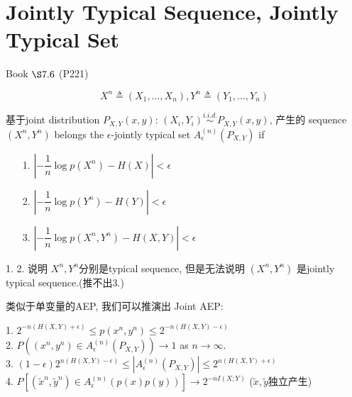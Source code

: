 \section{Jointly Typical Sequence, Jointly Typical Set}
\centerline{Book $\S 7.6$ (P221)}
$$X^n\triangleq \left(X_1,\ldots,X_n\right), Y^n\triangleq \left(Y_1,\ldots,Y_n\right)$$

\begin{definition}
基于joint distribution $P_{X,Y}(x,y)$: $(X_i,Y_i)\stackrel{i.i.d.}{\sim}P_{X,Y}(x,y)$, 产生的 sequence $(X^n,Y^n)$ belongs the $\epsilon$-jointly typical set $A_{\epsilon}^{(n)}(P_{X,Y})$ if
\begin{itemize}
\item[1.] $\left|-\dfrac{1}{n}\log p(X^n)-H(X)\right|<\epsilon$
\item[2.] $\left|-\dfrac{1}{n}\log p(Y^n)-H(Y)\right|<\epsilon$
\item[3.] $\left|-\dfrac{1}{n}\log p(X^n,Y^n)-H(X,Y)\right|<\epsilon$
\end{itemize}
\end{definition}
1. 2. 说明 $X^n,Y^n$分别是typical sequence, 但是无法说明 $(X^n,Y^n)$ 是jointly typical sequence.(推不出3.)

类似于单变量的AEP, 我们可以推演出 Joint AEP:
\begin{proposition}
1. $2^{-n\left(H(X,Y)+\epsilon\right)}\leq p(x^n,y^n)\leq 2^{-n\left(H(X,Y)-\epsilon\right)}$ \\
2. $P\left(\left(x^n,y^n\right)\in A_{\epsilon}^{(n)}(P_{X,Y})\right) \to 1$ as $n\to\infty$. \\
3. $(1-\epsilon)2^{n\left(H(X,Y)-\epsilon\right)}\leq |A_{\epsilon}^{(n)}(P_{X,Y})|\leq 2^{n\left(H(X,Y)+\epsilon\right)}$ \\
4. $P\left[(\tilde{x}^n,\tilde{y}^n)\in A_{\epsilon}^{(n)}(p(x)p(y))\right]\to 2^{-nI(X;Y)}$ \qquad($\tilde{x},\tilde{y}$独立产生)
\end{proposition}

